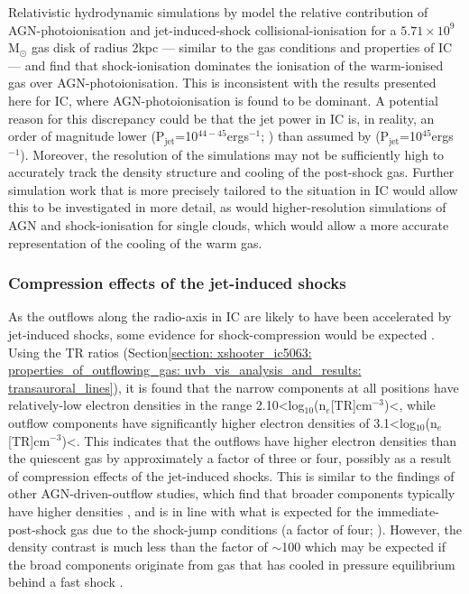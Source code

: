 Relativistic hydrodynamic simulations by \citet{Meenakshi2022a} model the relative contribution of AGN-photoionisation and jet-induced-shock collisional-ionisation for a $5.71\times10^9$\;M$_\odot$ gas disk of radius 2\;kpc --- similar to the gas conditions and properties of IC --- and find that shock-ionisation dominates the ionisation of the warm-ionised gas over AGN-photoionisation. This is inconsistent with the results presented here for IC, where AGN-photoionisation is found to be dominant. A potential reason for this discrepancy could be that the jet power in IC is, in reality, an order of magnitude lower (P$_\mathrm{jet}$=10$^{44-45}$\;erg\;s$^{-1}$; \citealt{Mukherjee2018}) than assumed by \citet{Meenakshi2022a} (P$_\mathrm{jet}$=10$^{45}$\;erg\;s$^{-1}$). Moreover, the resolution of the simulations may not be sufficiently high to accurately track the density structure and cooling of the post-shock gas. Further simulation work that is more precisely tailored to the situation in IC would allow this to be investigated in more detail, as would higher-resolution simulations of AGN and shock-ionisation for single clouds, which would allow a more accurate representation of the cooling of the warm gas.

\subsubsection{Compression effects of the jet-induced shocks}
\label{section: xshooter_ic5063: discussion: compression}

As the outflows along the radio-axis in IC are likely to have been accelerated by jet-induced shocks, some evidence for shock-compression would be expected \citep{Sutherland2017}. Using the TR ratios (Section\;\ref{section: xshooter_ic5063: properties_of_outflowing_gas: uvb_vis_analysis_and_results: transauroral_lines}), it is found that the narrow components at all positions have relatively-low electron densities in the range \mbox{2.10\;\textless\;log$_{10}$(n$_e$[TR]\;cm$^{-3}$)\;\textless{}}, while outflow components have significantly higher electron densities of \mbox{3.1\;\textless\;log$_{10}$(n$_e$[TR]\;cm$^{-3}$)\;\textless{}}. This indicates that the outflows have higher electron densities than the quiescent gas by approximately a factor of three or four, possibly as a result of compression effects of the jet-induced shocks. This is similar to the findings of other AGN-driven-outflow studies, which find that broader components typically have higher densities \citep{Holt2011, Rose2018, Santoro2018, Santoro2020}, and is in line with what is expected for the immediate-post-shock gas due to the shock-jump conditions (a factor of four; \citealt{Sutherland2017}). However, the density contrast is much less than the factor of $\sim$100 which may be expected if the broad components originate from gas that has cooled in pressure equilibrium behind a fast shock \citep{Sutherland2017}.

